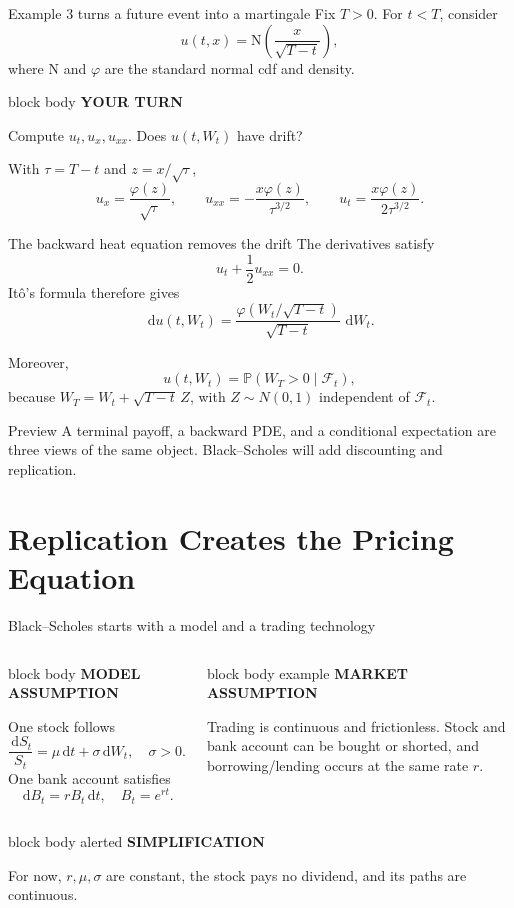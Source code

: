 \documentclass[handout,10pt,aspectratio=169]{beamer}
\newenvironment{modelbox}{%
  \begin{beamercolorbox}[rounded=true,sep=0.7em,wd=\textwidth]{block body}
  \textbf{\color{CourseBlue}MODEL ASSUMPTION}\quad
}{\end{beamercolorbox}}
\newenvironment{marketbox}{%
  \begin{beamercolorbox}[rounded=true,sep=0.7em,wd=\textwidth]{block body example}
  \textbf{\color{CourseGreen}MARKET ASSUMPTION}\quad
}{\end{beamercolorbox}}
\newenvironment{simplificationbox}{%
  \begin{beamercolorbox}[rounded=true,sep=0.7em,wd=\textwidth]{block body alerted}
  \textbf{\color{CourseRed}SIMPLIFICATION}\quad
}{\end{beamercolorbox}}
\newenvironment{pausebox}{%
  \begin{beamercolorbox}[rounded=true,sep=0.8em,wd=\textwidth]{block body}
  \textbf{\color{CourseGold}YOUR TURN}\quad
}{\end{beamercolorbox}}
\newcommand{\dd}{\,\mathrm d}
\newcommand{\Pp}{\mathbb P}
\newcommand{\cF}{\mathcal F}
\newcommand{\Ncdf}{\mathrm N}
\newcommand{\phiN}{\varphi}
\newcommand{\1}{\mathbf 1}
\begin{document}
\begin{frame}{Example 3 turns a future event into a martingale}
Fix \(T>0\). For \(t<T\), consider
\[
u(t,x)=\Ncdf\!\left(\frac{x}{\sqrt{T-t}}\right),
\]
where \(\Ncdf\) and \(\phiN\) are the standard normal cdf and density.
\begin{pausebox}
Compute \(u_t,u_x,u_{xx}\). Does \(u(t,W_t)\) have drift?
\end{pausebox}

With \(\tau=T-t\) and \(z=x/\sqrt{\tau}\),
\[
u_x=\frac{\phiN(z)}{\sqrt{\tau}},
\qquad
u_{xx}=-\frac{x\phiN(z)}{\tau^{3/2}},
\qquad
u_t=\frac{x\phiN(z)}{2\tau^{3/2}}.
\]
\end{frame}

\begin{frame}{The backward heat equation removes the drift}
The derivatives satisfy
\[
\boxed{u_t+\frac12u_{xx}=0.}
\]
It\^o's formula therefore gives
\[
\boxed{
\dd u(t,W_t)
=\frac{\phiN(W_t/\sqrt{T-t})}{\sqrt{T-t}}\,\dd W_t.}
\]

Moreover,
\[
u(t,W_t)=\Pp(W_T>0\mid\cF_t),
\]
because \(W_T=W_t+\sqrt{T-t}\,Z\), with \(Z\sim N(0,1)\) independent of
\(\cF_t\).
\begin{exampleblock}{Preview}
A terminal payoff, a backward PDE, and a conditional expectation are three
views of the same object. Black--Scholes will add discounting and replication.
\end{exampleblock}
\end{frame}


\section{Replication Creates the Pricing Equation}

\begin{frame}{Black--Scholes starts with a model and a trading technology}
\begin{columns}[T,onlytextwidth]
\begin{modelbox}
One stock follows
\[
\frac{\dd S_t}{S_t}=\mu\dd t+\sigma\dd W_t,\quad \sigma>0.
\]
One bank account satisfies
\[
\dd B_t=rB_t\dd t,\quad B_t=e^{rt}.
\]
\end{modelbox}
\begin{marketbox}
Trading is continuous and frictionless. Stock and bank account can be bought
or shorted, and borrowing/lending occurs at the same rate \(r\).
\end{marketbox}
\end{columns}
\medskip
\begin{simplificationbox}
For now, \(r,\mu,\sigma\) are constant, the stock pays no dividend, and its
paths are continuous.
\end{simplificationbox}
\end{frame}
\end{document}
